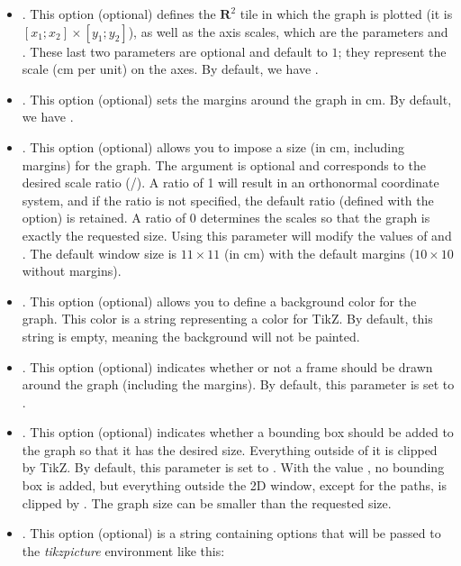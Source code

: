 \begin{itemize}
\item {}. This option (optional) defines the $\mathbf R^2$ tile in which the graph is plotted (it is $[x_1;x_2]\times[y_1;y_2]$), as well as the axis scales, which are the parameters  and . These last two parameters are optional and default to $1$; they represent the scale (cm per unit) on the axes.
 By default, we have .

\item {}. This option (optional) sets the margins around the graph in cm. By default, we have .

\item {}. This option (optional) allows you to impose a size (in cm, including margins) for the graph. The  argument is optional and corresponds to the desired scale ratio (/). A ratio of 1 will result in an orthonormal coordinate system, and if the ratio is not specified, the default ratio (defined with the  option) is retained. A ratio of $0$ determines the scales so that the graph is exactly the requested size. Using this parameter will modify the values ​​of  and . The default window size is $11\times11$ (in cm) with the default margins ($10\times10$ without margins).

\item {}. This option (optional) allows you to define a background color for the graph. This color is a string representing a color for TikZ. By default, this string is empty, meaning the background will not be painted.

\item {}. This option (optional) indicates whether or not a frame should be drawn around the graph (including the margins). By default, this parameter is set to \false.

\item {}. This option (optional) indicates whether a bounding box should be added to the graph so that it has the desired size. Everything outside of it is clipped by TikZ. By default, this parameter is set to \true. With the value \false, no bounding box is added, but everything outside the 2D window, except for the paths, is clipped by \luadrawenv. The graph size can be smaller than the requested size.

\item {}. This option (optional) is a string containing options that will be passed to the \emph{tikzpicture} environment like this:
\begin{TeXcode}
\begin{tikzpicture}[line join=round <,pictureoptions>]
\end{TeXcode}
\end{itemize}

